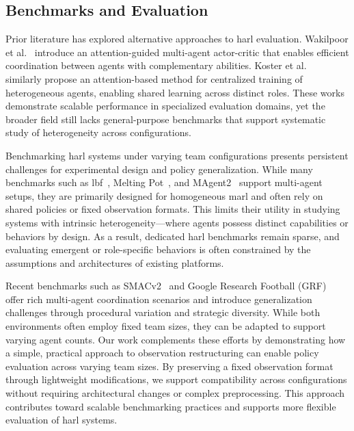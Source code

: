 \documentclass{article}
\begin{document}
\subsection{Benchmarks and Evaluation}

Prior literature has explored alternative approaches to \gls{harl} evaluation. 
Wakilpoor et al.~\cite{wakilpoor2020} introduce an attention-guided multi-agent actor-critic 
that enables efficient coordination between agents with complementary abilities. 
Koster et al.~\cite{koster2020} similarly propose an attention-based method for centralized 
training of heterogeneous agents, enabling shared learning across distinct roles. 
These works demonstrate scalable performance in specialized evaluation domains, 
yet the broader field still lacks general-purpose benchmarks that support systematic 
study of heterogeneity across configurations.

Benchmarking \gls{harl} systems under varying team configurations presents persistent
challenges for experimental design and policy generalization. While many benchmarks such 
as \gls{lbf}~\cite{papoudakis2021}, Melting Pot~\cite{leibo2021}, and MAgent2~\cite{zheng2017} 
support multi-agent setups, they are primarily designed for homogeneous \gls{marl} 
and often rely on shared policies or fixed observation formats. This limits 
their utility in studying systems with intrinsic heterogeneity—where agents possess 
distinct capabilities or behaviors by design. As a result, dedicated \gls{harl} benchmarks 
remain sparse, and evaluating emergent or role-specific behaviors is often constrained 
by the assumptions and architectures of existing platforms.

Recent benchmarks such as SMACv2~\cite{ellis2023} and Google Research Football 
(GRF)~\cite{kurach2020} offer rich multi-agent coordination scenarios and introduce 
generalization challenges through procedural variation and strategic diversity. While both 
environments often employ fixed team sizes, they can be adapted to support varying agent counts.
Our work complements these efforts by demonstrating how a simple, practical approach to 
observation restructuring can enable policy evaluation across varying team sizes. By 
preserving a fixed observation format through lightweight modifications, we support compatibility 
across configurations without requiring architectural changes or complex preprocessing.
This approach contributes toward scalable benchmarking practices and supports 
more flexible evaluation of \gls{harl} systems.
\end{document}
